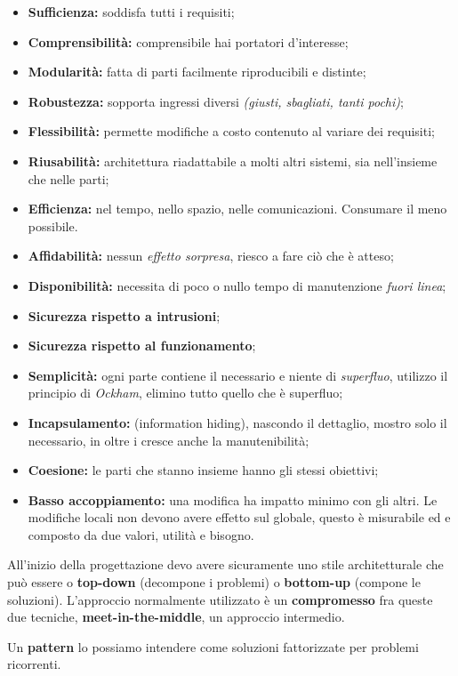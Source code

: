 \begin{itemize}

	\item \textbf{Sufficienza:} soddisfa tutti i requisiti;
	\item \textbf{Comprensibilità:} comprensibile hai portatori d'interesse;
	\item \textbf{Modularità:} fatta di parti facilmente riproducibili e distinte;
	\item \textbf{Robustezza:} sopporta ingressi diversi \textit{(giusti, sbagliati, tanti pochi)};
	\item \textbf{Flessibilità:} permette modifiche a costo contenuto al variare dei requisiti;
	\item \textbf{Riusabilità:} architettura riadattabile a molti altri sistemi, sia nell'insieme che nelle parti;
	\item \textbf{Efficienza:} nel tempo, nello spazio, nelle comunicazioni. Consumare il meno possibile.
	\item \textbf{Affidabilità:} nessun \textit{effetto sorpresa}, riesco a fare ciò che è atteso;
	\item \textbf{Disponibilità:} necessita di poco o nullo tempo di manutenzione \textit{fuori linea};
	\item \textbf{Sicurezza rispetto a intrusioni};
	\item \textbf{Sicurezza rispetto al funzionamento};
	\item \textbf{Semplicità:} ogni parte contiene il necessario e niente di \textit{superfluo}, utilizzo il principio di \textit{Ockham}, elimino tutto quello che è superfluo;
	\item \textbf{Incapsulamento:} (information hiding), nascondo il dettaglio, mostro solo il necessario, in oltre i cresce anche la manutenibilità;
	\item \textbf{Coesione:} le parti che stanno insieme hanno gli stessi obiettivi;
	\item \textbf{Basso accoppiamento:} una modifica ha impatto minimo con gli altri. Le modifiche locali non devono avere effetto sul globale, questo è misurabile ed e composto da due valori, utilità e bisogno.

\end{itemize}

All'inizio della progettazione devo avere sicuramente uno stile architetturale che può essere o \textbf{top-down} (decompone i problemi) o \textbf{bottom-up} (compone le soluzioni). L'approccio normalmente utilizzato è un \textbf{compromesso} fra queste due tecniche, \textbf{meet-in-the-middle}, un approccio intermedio.

Un \textbf{pattern} lo possiamo intendere come soluzioni fattorizzate per problemi ricorrenti.
